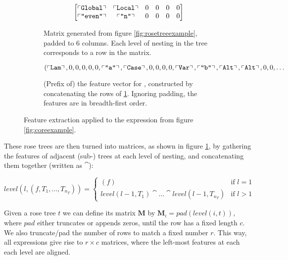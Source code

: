 \begin{figure}
\begin{subfigure}{\textwidth}
\begin{equation*}
\begin{bmatrix}
        \left\ulcorner \texttt{Global} \right\urcorner   & \left\ulcorner \texttt{Local} \right\urcorner       & 0                 & 0                   & 0               & 0                \\
        \left\ulcorner \texttt{"even"} \right\urcorner  & \left\ulcorner \texttt{"n"} \right\urcorner        & 0                 & 0                   & 0               & 0
      \end{bmatrix}
    \end{equation*}
    \caption{Matrix generated from figure \ref{fig:rosetreeexample}, padded to 6 columns. Each level of nesting in the tree corresponds to a row in the matrix.}
    \label{fig:matrixexample}
  \end{subfigure}
  \vspace{1ex}
  \begin{subfigure}{\textwidth}
    \begin{equation*}
      (\left\ulcorner \texttt{Lam} \right\urcorner, 0, 0, 0, 0, 0, \left\ulcorner \texttt{"a"} \right\urcorner, \left\ulcorner \texttt{Case} \right\urcorner, 0, 0, 0, 0, \left\ulcorner \texttt{Var} \right\urcorner, \left\ulcorner \texttt{"b"} \right\urcorner, \left\ulcorner \texttt{Alt} \right\urcorner, \left\ulcorner \texttt{Alt} \right\urcorner, 0, 0, \dots
     \end{equation*}
     \caption{(Prefix of) the feature vector for , constructed by concatenating the rows of \ref{fig:matrixexample}. Ignoring padding, the features are in breadth-first order.}
     \label{fig:vectorexample}
  \end{subfigure}
  \caption{Feature extraction applied to the expression  from figure \ref{fig:coreexample}.}
\end{figure}

These rose trees are then turned into matrices, as shown in figure \ref{fig:matrixexample}, by gathering the features of adjacent (sub-) trees at each level of nesting, and concatenating them together (written as $\cat$):

\begin{equation*}
  level(l, (f, T_1, \dots, T_{n_T})) =
    \begin{cases}
      (f)                                                    & \text{if $l = 1$} \\
      level(l - 1, T_1) \cat \dots \cat level(l - 1, T_{n_T}) & \text{if $l > 1$}
    \end{cases}
\end{equation*}

Given a rose tree $t$ we can define its matrix $\mathbf{M}$ by $\mathbf{M}_i = pad(level(i, t))$, where $pad$ either truncates or appends zeros, until the row has a fixed length $c$. We also truncate/pad the number of rows to match a fixed number $r$. This way, all expressions give rise to $r \times c$ matrices, where the left-most features at each each level are aligned.

